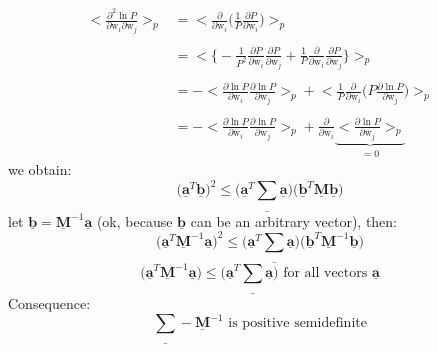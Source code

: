 \begin{equation}
	\begin{array}{ll}
	\Big< \frac{\partial^2 \ln P}{\partial \mathrm{w}_i 
					\partial \mathrm{w}_j}
	\Big>_p 
	& = \Big< \frac{\partial}{\partial \mathrm{w}_i} 
		\Big( \frac{1}{P} \frac{\partial P}{\partial \mathrm{w}_i}
		\Big) \Big>_p \\\\
	& = \Big< \Big\{-\frac{1}{P^2} \frac{\partial P}{\partial \mathrm{w}_i}
		\frac{\partial P}{\partial \mathrm{w}_j} + \frac{1}{P} 
		\frac{\partial}{\partial \mathrm{w}_i} \frac{\partial P}{
			\partial \mathrm{w}_j} \Big\} \Big>_p\\\\
	& = -\Big< \frac{\partial \ln P}{\partial \mathrm{w}_i} 
		\frac{\partial \ln P}{\partial \mathrm{w}_j}
		\Big>_p + \Big< \frac{1}{P}
		\frac{\partial}{\partial \mathrm{w}_i} 
			\Big(P \frac{\partial \ln P}{\partial \mathrm{w}_j}
			\big) \Big>_p\\\\
	& = -\Big< \frac{\partial \ln P}{\partial \mathrm{w}_i} 
		\frac{\partial \ln P}{\partial \mathrm{w}_j} \Big>_p 
		+ \frac{\partial}{\partial \mathrm{w}_i} 
		\underbrace{\Big< \frac{\partial \ln P}{\partial 
					\mathrm{w}_j} \Big>_p}_{= 0}
	\end{array}
\end{equation}
we obtain:
\begin{equation}
	\big( \underline{\mathbf{a}}^T \underline{\mathbf{b}} \big)^2
	\leq \big( \underline{\mathbf{a}}^T 
		\underline{\sum} \underline{\mathbf{a}} \big)
		\big( \underline{\mathbf{b}}^T \underline{\mathbf{M}}
			\underline{\mathbf{b}} \big)
\end{equation}
let $\underline{\mathbf{b}} = \underline{\mathbf{M}}^{-1} 
\underline{\mathbf{a}}$ (ok, because $\underline{\mathbf{b}}$ can be an arbitrary vector), then:
\begin{equation}
	\big( \underline{\mathbf{a}}^T \underline{\mathbf{M}}^{-1} 
		\underline{\mathbf{a}} \big)^2 
	\leq \big( \underline{\mathbf{a}}^T \underline{\sum} 
		\underline{\mathbf{a}} \big)
		\big( \underline{\mathbf{b}}^T \underline{\mathbf{M}}^{-1} 
		\underline{\mathbf{b}} \big)
\end{equation}
\begin{equation}
	\big( \underline{\mathbf{a}}^T \underline{\mathbf{M}}^{-1} 
		\underline{\mathbf{a}} \big)
	\leq \big( \underline{\mathbf{a}}^T \underline{\sum}
		\underline{\mathbf{a}} \big) \text{ for all vectors 
			$\underline{\mathbf{a}}$}
\end{equation}
Consequence:
\begin{equation}
	\underline{\sum} - \underline{\mathbf{M}}^{-1} 
		\text{ is positive semidefinite}
\end{equation}
